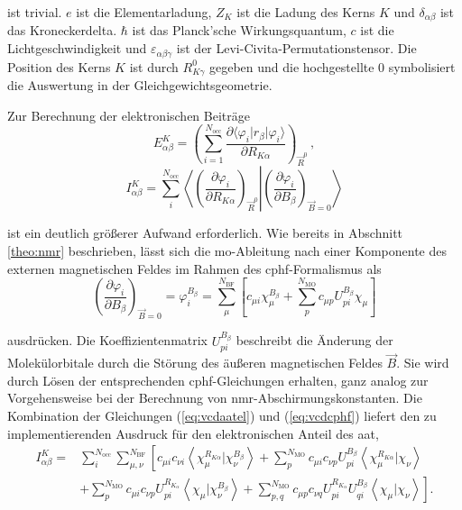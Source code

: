 	ist trivial. $e$ ist die Elementarladung, $Z_K$ ist die Ladung des Kerns $K$ und $\delta_{\alpha\beta}$ ist das Kroneckerdelta. $\hbar$ ist das Planck'sche Wirkungsquantum, $c$ ist die Lichtgeschwindigkeit und $\varepsilon_{\alpha\beta\gamma}$ ist der Levi-Civita-Permutationstensor. Die Position des Kerns $K$ ist durch $R^0_{K\gamma}$ gegeben und die hochgestellte $0$ symbolisiert die Auswertung in der Gleichgewichtsgeometrie.   
	
    Zur Berechnung der elektronischen Beiträge 
    \begin{equation}
      E^K_{\alpha\beta}=\left(\sum_{i=1}^{N_{\text{occ}}}\frac{\partial \langle\varphi_i\vert r_\beta\vert\varphi_i\rangle}{\partial R_{K\alpha}}\right)_{\vec{R}^0}\, , 
    \end{equation}
    \begin{equation}\label{eq:vcdaatel}
      I^K_{\alpha\beta}=\sum_{i}^{N_{\text{occ}}}\left\langle\left.\left(\frac{\partial \varphi_i}{\partial R_{K\alpha}}\right)_{\vec{R}^0}\right|\left(\frac{\partial \varphi_i}{\partial B_\beta}\right)_{\vec{B}=0}\right\rangle
    \end{equation}
    
    ist ein deutlich größerer Aufwand erforderlich. Wie bereits in Abschnitt \ref{theo:nmr} beschrieben, lässt sich die \ac{mo}-Ableitung nach einer Komponente des externen magnetischen Feldes im Rahmen des \ac{cphf}-Formalismus als 
    \begin{equation}\label{eq:vcdcphf}
    \left(\frac{\partial \varphi_i}{\partial B_\beta}\right)_{\vec{B}=0}=\varphi_i^{B_\beta}=\sum_{\mu}^{N_{\text{BF}}}\left[c_{\mu i}\chi_\mu^{B_\beta}+\sum_{p}^{N_{\text{MO}}}c_{\mu p}U_{pi}^{B_\beta}\chi_\mu\right]
	\end{equation}
	
	ausdrücken. Die Koeffizientenmatrix $U_{pi}^{B_\beta}$ beschreibt die Änderung der Molekülorbitale durch die Störung des äußeren magnetischen Feldes $\vec{B}$. Sie wird durch Lösen der entsprechenden \ac{cphf}-Gleichungen erhalten, ganz analog zur Vorgehensweise bei der Berechnung von \ac{nmr}-Abschirmungskonstanten. Die Kombination der Gleichungen (\ref{eq:vcdaatel}) und  (\ref{eq:vcdcphf}) liefert den zu implementierenden Ausdruck für den elektronischen Anteil des \ac{aat},
	\begin{equation}\label{eq:vcdaatelfinal}
	\begin{aligned}
	I^K_{\alpha\beta}=&\sum_{i}^{N_{\text{occ}}}\sum_{\mu,\nu}^{N_{\text{BF}}}\left[c_{\mu i}c_{\nu i}\left\langle\chi_\mu^{R_{K\alpha}}\vert\chi_\nu^{B_\beta}\right\rangle+\sum_{p}^{N_{\text{MO}}}c_{\mu i}c_{\nu p}U_{pi}^{B_\beta}\left\langle\chi_\mu^{R_{K\alpha}}\vert\chi_\nu\right\rangle\right.\\
	&\left.+\sum_{p}^{N_{\text{MO}}}c_{\mu i}c_{\nu p}U_{pi}^{R_{K_\alpha}}\left\langle\chi_\mu\vert\chi_\nu^{B_{\beta}}\right\rangle+\sum_{p,q}^{N_{\text{MO}}}c_{\mu p}c_{\nu q}U_{pi}^{R_{K_\alpha}}U_{qi}^{B_\beta}\left\langle\chi_\mu\vert\chi_\nu\right\rangle\right].
	\end{aligned}
	\end{equation}
	
